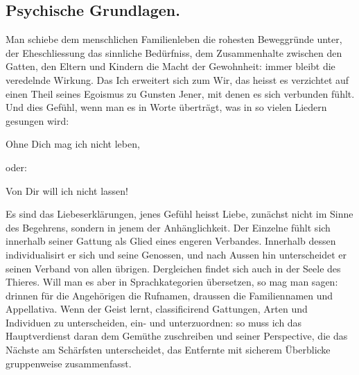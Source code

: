 \subsection*{Psychische Grundlagen.}

Man schiebe dem menschlichen Familienleben die rohesten Beweggründe unter, der Eheschliessung das sinnliche Bedürfniss, dem Zusammenhalte zwischen den Gatten, den Eltern und Kindern die Macht der Gewohnheit: immer bleibt die veredelnde Wirkung. Das Ich erweitert sich zum Wir, das heisst es verzichtet auf einen Theil seines Egoismus zu Gunsten Jener, mit denen es sich verbunden fühlt. Und dies Gefühl, wenn man es in Worte überträgt,  was in so vielen Liedern gesungen wird:

\begin{center}
Ohne Dich mag ich nicht leben,
\end{center}

\noindent oder:

\begin{center}
Von Dir will ich nicht lassen!
\end{center}

\noindent Es sind das Liebeserklärungen, jenes Gefühl heisst Liebe, zunächst nicht im Sinne des Begehrens, sondern in jenem der Anhänglichkeit. Der Einzelne fühlt sich innerhalb seiner Gattung als Glied eines engeren Verbandes. Innerhalb dessen individualisirt er sich und seine Genossen, und \label{fp.298} nach Aussen hin unterscheidet er seinen Verband von allen übrigen. Dergleichen findet sich auch in der Seele des Thieres. Will man es aber in Sprachkategorien übersetzen, so mag man sagen: drinnen für die Angehörigen die Rufnamen, draussen die Familiennamen und Appellativa. Wenn der Geist lernt, classificirend Gattungen, Arten und Individuen zu unterscheiden, ein- und unterzuordnen: so muss ich das Hauptverdienst daran dem Gemüthe zuschreiben und seiner Perspective, die das Nächste am Schärfsten unterscheidet, das Entfernte mit sicherem Überblicke gruppenweise zusammenfasst.

